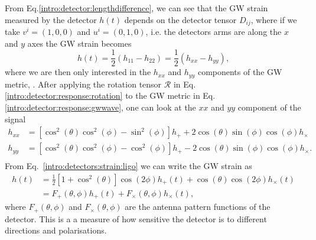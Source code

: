 From Eq.\ref{intro:detector:lengthdifference}, we can see that the \gls{GW}
strain measured by the detector $h(t)$ depends on the detector
tensor $D_{ij}$, where if we take $v^i = (1,0,0)$ and $u^i = (0,1,0)$, i.e. the detectors arms are along the $x$ and $y$ axes the \gls{GW} strain becomes 
\begin{equation}
    \label{intro:detectors:strain:ligo}
    h(t) = \frac{1}{2} \left( h_{11} - h_{22} \right) = \frac{1}{2} \left( h_{xx} - h_{yy} \right),
\end{equation}
where we are then only interested in the $h_{xx}$ and $h_{yy}$ components of the \gls{GW} metric, \citep{maggioreGravitationalWaves}.
After applying the rotation tensor $\mathcal{R}$ in Eq.\ref{intro:detector:response:rotation} to the \gls{GW} metric in Eq.\ref{intro:detector:response:gwwave}, one can look at the $xx$ and $yy$ component of the signal
\begin{equation}
    \begin{split}
        h_{xx} &= \left[ \cos^2(\theta) \cos^2 (\phi) - \sin^2 (\phi)\right]h_{+} + 2\cos (\theta) \sin (\phi) \cos (\phi) h_{\times}\\
        h_{yy} &= \left[ \cos^2(\theta) \cos^2 (\phi) - \cos^2 (\phi)\right]h_{+} - 2\cos(\theta) \sin (\phi) \cos(\phi) h_{\times} . \\
    \end{split}
\end{equation}
From Eq.~\ref{intro:detectors:strain:ligo} we can write the \gls{GW} strain as
\begin{equation}
    \label{intro:detector:response:strain:polarisations}
    \begin{split}
        h(t) &= \frac{1}{2} \left[ 1 + \cos^2 \left(\theta\right) \right] \cos\left(2\phi\right) h_{+}(t) + \cos \left(\theta\right) \cos \left(2\phi \right)h_{\times}(t)\\
        &= F_{+}(\theta,\phi)h_{+}(t) + F_{\times}(\theta,\phi)h_{\times}(t),
    \end{split}
\end{equation}
where $F_{+}(\theta,\phi)$ and $F_{\times}(\theta,\phi)$ are the antenna pattern functions of the detector.
This is a a measure of how sensitive the detector is to different directions and polarisations. 

